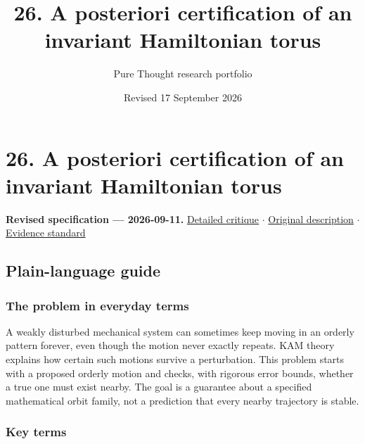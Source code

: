 \documentclass[
  11pt,
]{article}
\title{26. A posteriori certification of an invariant Hamiltonian torus}
\author{Pure Thought research portfolio}
\date{Revised 17 September 2026}
\begin{document}
\maketitle
\thispagestyle{empty}
\clearpage

\section{26. A posteriori certification of an invariant Hamiltonian
torus}

\textbf{Revised specification --- 2026-09-11.}
\href{https://github.com/rick-stevens-ai/Pure-Thought/blob/main/reviews/26-KAM-Theory-Planetary-Stability.md}{Detailed
critique} \ensuremath{\cdot}
\href{https://github.com/rick-stevens-ai/Pure-Thought/blob/main/archive/original-PRDs/26-KAM-Theory-Planetary-Stability.md}{Original
description} \ensuremath{\cdot}
\href{https://github.com/rick-stevens-ai/Pure-Thought/blob/main/reviews/EVIDENCE-STANDARD.md}{Evidence
standard}

\subsection{Plain-language guide}

\subsubsection{The problem in everyday terms}

A weakly disturbed mechanical system can sometimes keep moving in an
orderly pattern forever, even though the motion never exactly repeats.
KAM theory explains how certain such motions survive a perturbation.
This problem starts with a proposed orderly motion and checks, with
rigorous error bounds, whether a true one must exist nearby. The goal is
a guarantee about a specified mathematical orbit family, not a
prediction that every nearby trajectory is stable.

\subsubsection{Key terms}
\end{document}
